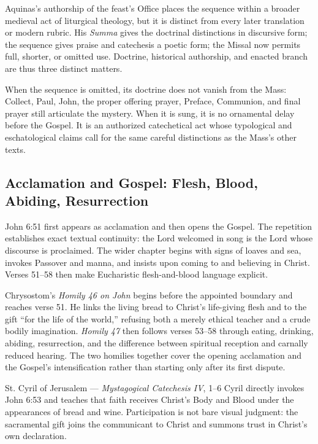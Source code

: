Aquinas's authorship of the feast's Office places the sequence within a broader medieval act of liturgical theology, but it is distinct from every later translation or modern rubric. His \emph{Summa} gives the doctrinal distinctions in discursive form; the sequence gives praise and catechesis a poetic form; the Missal now permits full, shorter, or omitted use. Doctrine, historical authorship, and enacted branch are thus three distinct matters.

When the sequence is omitted, its doctrine does not vanish from the Mass: Collect, Paul, John, the proper offering prayer, Preface, Communion, and final prayer still articulate the mystery. When it is sung, it is no ornamental delay before the Gospel. It is an authorized catechetical act whose typological and eschatological claims call for the same careful distinctions as the Mass's other texts.

\subsection*{Acclamation and Gospel: Flesh, Blood, Abiding, Resurrection\enspace{}}

John 6:51 first appears as acclamation and then opens the Gospel. The repetition establishes exact textual continuity: the Lord welcomed in song is the Lord whose discourse is proclaimed. The wider chapter begins with signs of loaves and sea, invokes Passover and manna, and insists upon coming to and believing in Christ. Verses 51--58 then make Eucharistic flesh-and-blood language explicit.

Chrysostom's \emph{Homily 46 on John} begins before the appointed boundary and reaches verse 51. He links the living bread to Christ's life-giving flesh and to the gift “for the life of the world,” refusing both a merely ethical teacher and a crude bodily imagination. \emph{Homily 47} then follows verses 53--58 through eating, drinking, abiding, resurrection, and the difference between spiritual reception and carnally reduced hearing. The two homilies together cover the opening acclamation and the Gospel's intensification rather than starting only after its first dispute.

\begin{sourcecard}{St. Cyril of Jerusalem --- \emph{Mystagogical Catechesis IV}, 1--6}
Cyril directly invokes John 6:53 and teaches that faith receives Christ's Body and Blood under the appearances of bread and wine. Participation is not bare visual judgment: the sacramental gift joins the communicant to Christ and summons trust in Christ's own declaration.
\end{sourcecard}

